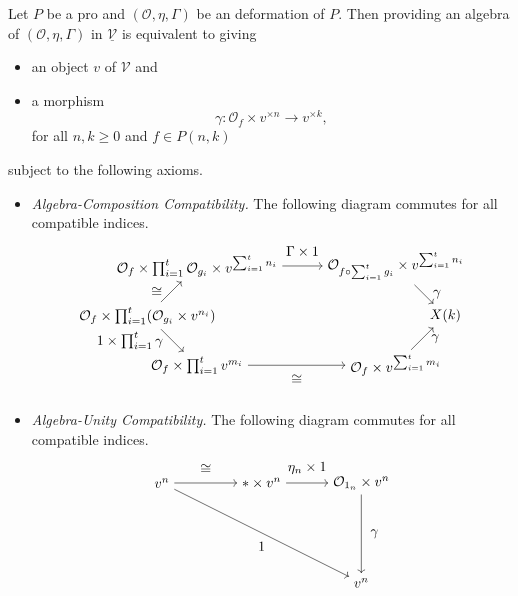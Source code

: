 \documentclass{tac}
\begin{document}
\begin{proposition}
Let $P$ be a pro and $(\mathcal{O},\eta,\Gamma)$ be an deformation of $P$.
Then providing an algebra of $(\mathcal{O},\eta,\Gamma)$ in $\underline{\mathcal{V}}$ is equivalent to giving
\begin{itemize}
    \item an object $v$ of $\mathcal{V}$ and
    \item a morphism 
    \[
    \gamma:\mathcal{O}_{f}\times v^{\times n}\to v^{\times k},
    \]
    for all $n,k\geq 0$ and $f\in P(n,k)$
\end{itemize}
subject to the following axioms.
\begin{itemize}
\item \emph{Algebra-Composition Compatibility.} The following diagram commutes for all 
compatible indices.
\[
  \begin{tikzpicture}[node distance=5cm, auto]
        \node (A) {$\mathcal{O}_{f}\times\prod_{i=1}^t(\mathcal{O}_{g_i}\times v^{n_i})$};
        \node (B)[right of=A,node distance=1.25cm]{};
        \node(C)[above of=B,node distance=1.25cm]{$\mathcal{O}_{f}\times\prod_{i=1}^t\mathcal{O}_{g_i}\times v^{\sum_{i=1}^tn_i}$};
        \node(D)[below of=B,node distance=1.25cm]{$\mathcal{O}_{f}\times\prod_{i=1}^t v^{m_i}$};
        \node (E)[right of=C]{$\mathcal{O}_{f\circ\sum_{i=1}^tg_i}\times v^{\sum_{i=1}^tn_i}$};
        \node (F)[right of=D]{$\mathcal{O}_{f}\times v^{\sum_{i=1}^tm_i}$};
        \node (G)[right of=B,node distance=6.25cm]{$X(k)$};
        \draw[->] (A) to node[left=3] {$\cong$} (C);
        \draw[->](C) to node[above=3]{$\Gamma\times 1$}(E);
        \draw[->](E) to node[right=3]{$\gamma$}(G);
        \draw[->] (A) to node[left=3] {$1\times\prod_{i=1}^t\gamma$} (D);
        \draw[->] (D) to node[below=3]{$\cong$}(F);
        \draw[->](F) to node[right=3]{$\gamma$}(G);
    \end{tikzpicture}
\]
\item \emph{Algebra-Unity Compatibility.} The following diagram commutes for all 
compatible indices.
\[
  \begin{tikzpicture}[node distance=2.5cm, auto]
        \node (A) {$v^n$};
       \node (B)[right of=A]{$*\times v^n$};
       \node (C)[right of=B]{$\mathcal{O}_{1_n}\times v^n$};
       \node (D)[below of=C]{$v^n$};
       \draw[->] (A) to node[above=3]{$\cong$}(B);
       \draw[->] (B) to node[above=3]{$\eta_{n}\times 1$}(C);
       \draw[->](C) to node[right=3]{$\gamma$}(D);
       \draw[->](A) to node[below=3]{$1$} (D);
    \end{tikzpicture}
\]
\end{itemize}
\end{proposition}
\end{document}
